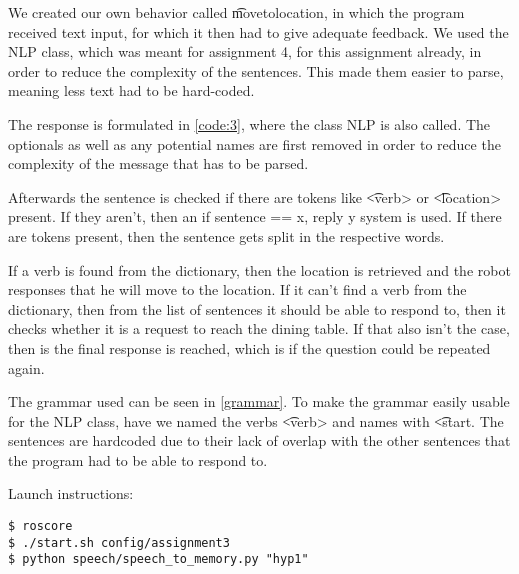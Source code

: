 
We created our own behavior called \t{movetolocation}, in which the program received text input, for which it then had to give adequate feedback. We used the NLP class, which was meant for assignment 4, for this assignment already, in order to reduce the complexity of the sentences. This made them easier to parse, meaning less text had to be hard-coded.



The response is formulated in \cref{code:3}, where the class NLP is also called. The optionals as well as any potential names are first removed in order to reduce the complexity of the message that has to be parsed. 

Afterwards the sentence is checked if there are tokens like \t{<verb>} or \t{<location>} present. If they aren't, then an if sentence == x, reply y system is used. If there are tokens present, then the sentence gets split in the respective words. 

If a verb is found from the dictionary, then the location is retrieved and the robot responses that he will move to the location. If it can't find a verb from the dictionary, then from the list of sentences it should be able to respond to, then it checks whether it is a request to reach the dining table. If that also isn't the case, then is the final response is reached, which is if the question could be repeated again.



The grammar used can be seen in \cref{grammar}. To make the grammar easily usable for the NLP class, have we named the verbs \t{<verb>} and names with \t{<start}. The sentences are hardcoded due to their lack of overlap with the other sentences that the program had to be able to respond to.

Launch instructions:
\begin{lstlisting}
$ roscore
$ ./start.sh config/assignment3
$ python speech/speech_to_memory.py "hyp1"
\end{lstlisting}